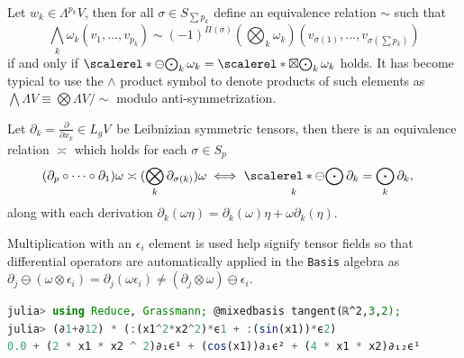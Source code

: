 \documentclass{juliacon}
\DeclareMathOperator*{\bigboxtimes}{\scalerel*{\boxtimes}{\bigodot}}
\DeclareMathOperator*{\bigominus}{\scalerel*{\ominus}{\bigodot}}
\begin{document}
\begin{definition}
	Let $w_k\in\Lambda^{p_k}V$, then for all $\sigma\in S_{\sum p_k}$ define an equivalence relation $\sim$ such that
	$$ \bigwedge_k \omega_k(v_{1},\dots,v_{p_k}) \sim (-1)^{\Pi(\sigma)}(\bigotimes_k \omega_k)(v_{\sigma(1)},\dots,v_{\sigma(\sum p_k)}) $$
	if and only if $ \bigominus_k\omega_k = \bigboxtimes_k\omega_k$ holds.
	It has become typical to use the $\wedge$ product symbol to denote products of such elements as $\bigwedge\Lambda V \equiv \bigotimes\Lambda V/\sim$ modulo anti-symmetrization.
\end{definition}

\begin{definition}
	Let $\partial_k = \frac\partial{\partial x_k}\in L_gV\,$ be Leibnizian symmetric tensors, then there is an equivalence relation $\asymp$ which holds for each $\sigma\in S_p$
	\begin{align*}
		(\partial_p \circ \dots\circ  \partial_1)\omega &\asymp(\bigotimes_k \partial_{\sigma(k)})\omega  \iff \bigominus_k\partial_k = \bigodot_k\partial_k,
	\end{align*}
	along with each derivation $\partial_k(\omega\eta) = \partial_k(\omega)\eta + \omega\partial_k(\eta)$.
\end{definition}

Multiplication with an $\epsilon_i$ element is used help signify tensor fields so that differential operators are automatically applied in the \verb`Basis` algebra as $\partial_j\ominus (\omega\otimes\epsilon_i) = \partial_j(\omega\epsilon_i) \neq (\partial_j\otimes\omega)\ominus\epsilon_i$.
\begin{lstlisting}[language = Julia]
julia> using Reduce, Grassmann; @mixedbasis tangent(ℝ^2,3,2);
julia> (∂1+∂12) * (:(x1^2*x2^2)*ϵ1 + :(sin(x1))*ϵ2)
0.0 + (2 * x1 * x2 ^ 2)∂₁ϵ¹ + (cos(x1))∂₁ϵ² + (4 * x1 * x2)∂₁₂ϵ¹
\end{lstlisting}

\end{document}
